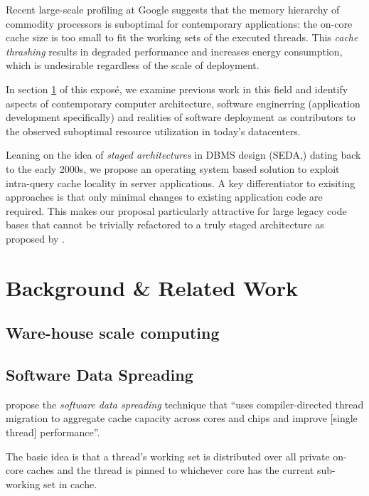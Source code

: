 \documentclass{article}
\begin{document}
Recent large-scale profiling at Google \cite{kanev2015profiling} suggests that the memory hierarchy of commodity
processors is suboptimal for contemporary applications:
the on-core cache size is too small to fit the working sets of the executed threads.
This \textit{cache thrashing} results in degraded performance and increases energy consumption, which is undesirable
regardless of the scale of deployment.

In section \ref{relatedwork} of this exposé, we examine previous work in this field and
identify aspects of contemporary computer architecture, software enginerring (application development specifically)
and realities of software deployment as contributors to the observed suboptimal resource utilization in today's datacenters.

Leaning on the idea of \emph{staged architectures} in DBMS design (SEDA,\cite{seda}) dating back to the early 2000s,
we propose an operating system based solution to exploit intra-query cache locality in server applications.
A key differentiator to exisiting approaches is that only minimal changes to existing application code are required.
This makes our proposal particularly attractive for large legacy code bases that cannot be trivially refactored to a
truly staged architecture as proposed by \citeauthor{seda}.

\section{Background \& Related Work}\label{relatedwork}

\subsection{Ware-house scale computing}
\subsection{Software Data Spreading}
\citeauthor{sodaspr} propose the \textit{software data spreading} technique that
``uses compiler-directed thread migration to aggregate cache capacity across cores and chips and improve [single thread] performance''\cite{sodaspr}.

The basic idea is that a thread's working set is distributed over all private on-core caches
and the thread is pinned to whichever core has the current sub-working set in cache.
\end{document}
